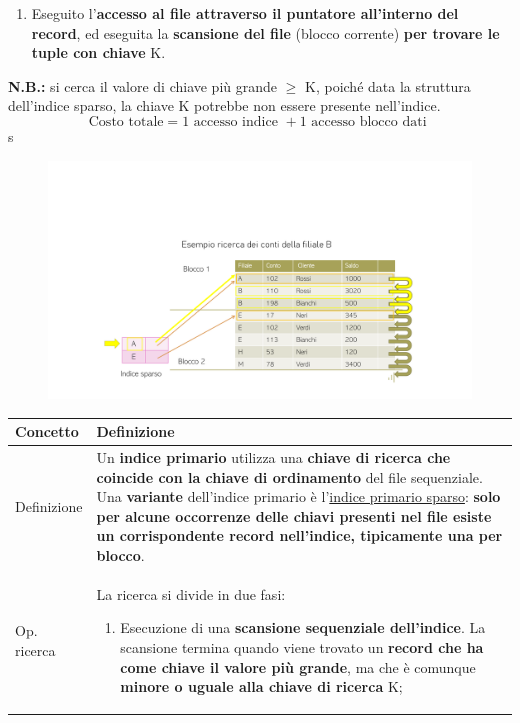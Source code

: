 \documentclass[a4paper]{article}
\begin{document}
\begin{enumerate}
\begin{enumerate}
			\item Eseguito l'\textbf{accesso al file attraverso il puntatore all'interno del record}, ed eseguita la \textbf{scansione del file} (blocco corrente) \textbf{per trovare le tuple con chiave} K.
		\end{enumerate}
		\textbf{N.B.:} si cerca il valore di chiave più grande $\ge$ K, poiché data la struttura dell'indice sparso, la chiave K potrebbe non essere presente nell'indice.
		\begin{equation*}
			\text{Costo totale} = 1 \text{ accesso indice } + 1 \text{ accesso blocco dati }
		\end{equation*}\newpage
		s
		\begin{figure}[!htp]
			\centering
			\includegraphics[width=\textwidth]{img/ex/indice-sparso-2.pdf}
		\end{figure}
		
		\begin{table}[!htp]
			\centering
			\begin{tabular}{@{} l p{24em} @{}}
				\toprule
				Concetto & Definizione \\
				\midrule
				Definizione & Un \textbf{indice primario} utilizza una \textbf{chiave di ricerca che coincide con la chiave di ordinamento} del file sequenziale. Una \textbf{variante} dell'indice primario è l'\underline{indice primario sparso}: \textbf{solo per alcune occorrenze delle chiavi presenti nel file esiste un corrispondente record nell'indice, tipicamente una per blocco}. \\ [.7em]
				Op. ricerca & La ricerca si divide in due fasi:
				\begin{enumerate}
					\item Esecuzione di una \textbf{scansione sequenziale dell'indice}. La scansione termina quando viene trovato un \textbf{record che ha come chiave il valore più grande}, ma che è comunque \textbf{minore o uguale alla chiave di ricerca} K;
					

\end{enumerate}
\end{tabular}
\end{table}
\end{enumerate}
\end{document}
